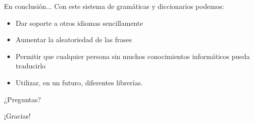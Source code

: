 \begin{tframe}{En conclusión...}
	Con este sistema de gramáticas y diccionarios podemos:
	\begin{itemize}
		\item Dar soporte a otros idiomas sencillamente
		\item Aumentar la aleatoriedad de las frases
		\item Permitir que cualquier persona sin muchos conocimientos informáticos pueda traducirlo
		\item<+-| alert@+> Utilizar, en un futuro, diferentes librerías.
	\end{itemize}
\end{tframe}


\begin{frame}[c]{}
	\begin{center}
		\Huge ¿Preguntas?
	\end{center}
\end{frame}

\begin{frame}[c]{}
	\begin{center}
		\Huge ¡Gracias!
	\end{center}
\end{frame}
